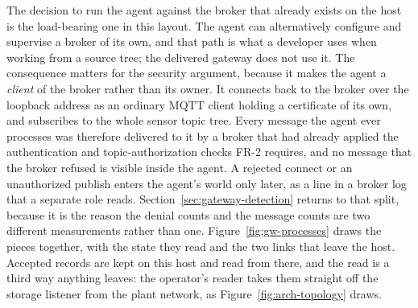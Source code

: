 \documentclass[12pt,a4paper]{report}
\begin{document}
The decision to run the agent against the broker that already exists
on the host is the load-bearing one in this layout. The agent can
alternatively configure and supervise a broker of its own, and that
path is what a developer uses when working from a source tree; the
delivered gateway does not use it. The consequence matters for the
security argument, because it makes the agent a \emph{client} of the
broker rather than its owner. It connects back to the broker over the
loopback address as an ordinary MQTT client holding a certificate of
its own, and subscribes to the whole sensor topic tree. Every message
the agent ever processes was therefore delivered to it by a broker
that had already applied the authentication and topic-authorization
checks FR-2 requires, and no message that the broker refused is
visible inside the agent. A rejected connect or an unauthorized
publish enters the agent's world only later, as a line in a broker
log that a separate role reads. Section~\ref{sec:gateway-detection}
returns to that split, because it is the reason the denial counts and
the message counts are two different measurements rather than one.
Figure~\ref{fig:gw-processes} draws the pieces together, with the
state they read and the two links that leave the host. Accepted records are kept on this host and read from there, and the
read is a third way anything leaves: the operator's reader takes them
straight off the storage listener from the plant network, as
Figure~\ref{fig:arch-topology} draws.
\end{document}
